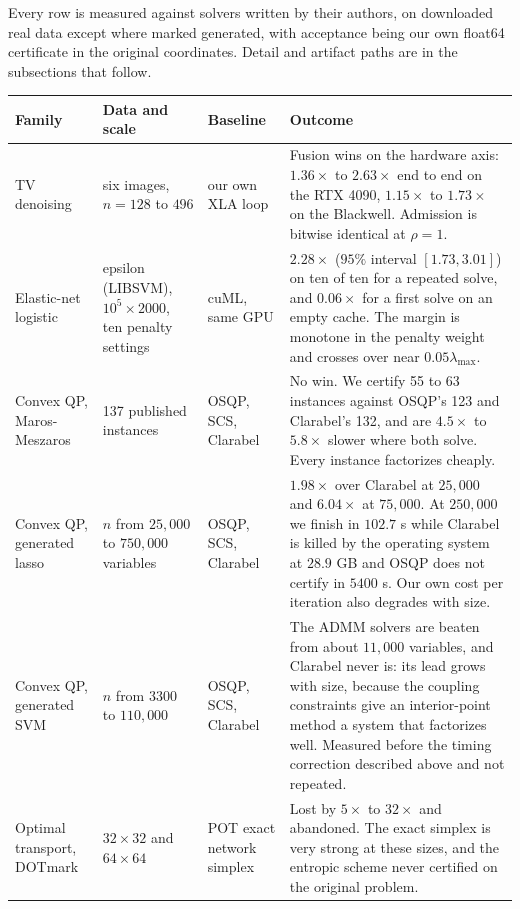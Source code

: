\documentclass[11pt]{article}
\begin{document}
Every row is measured against solvers written by their authors, on downloaded
real data except where marked generated, with acceptance being our own
float64 certificate in the original coordinates. Detail and artifact paths are
in the subsections that follow.

\begin{center}
\small
\begin{tabular}{p{2.5cm}p{2.6cm}p{2.2cm}p{6.1cm}}
\toprule
Family & Data and scale & Baseline & Outcome \\
\midrule
TV denoising & six images, $n=128$ to $496$ & our own XLA loop & Fusion wins on the hardware axis: $1.36\times$ to $2.63\times$ end to end on the RTX 4090, $1.15\times$ to $1.73\times$ on the Blackwell. Admission is bitwise identical at $\rho=1$. \\
\addlinespace
Elastic-net logistic & epsilon (LIBSVM), $10^5\times2000$, ten penalty settings & cuML, same GPU & $2.28\times$ ($95\%$ interval $[1.73, 3.01]$) on ten of ten for a repeated solve, and $0.06\times$ for a first solve on an empty cache. The margin is monotone in the penalty weight and crosses over near $0.05\lambda_{\max}$. \\
\addlinespace
Convex QP, Maros-Meszaros & 137 published instances & OSQP, SCS, Clarabel & No win. We certify 55 to 63 instances against OSQP's 123 and Clarabel's 132, and are $4.5\times$ to $5.8\times$ slower where both solve. Every instance factorizes cheaply. \\
\addlinespace
Convex QP, generated lasso & $n$ from $25{,}000$ to $750{,}000$ variables & OSQP, SCS, Clarabel & $1.98\times$ over Clarabel at $25{,}000$ and $6.04\times$ at $75{,}000$. At $250{,}000$ we finish in $102.7$ s while Clarabel is killed by the operating system at $28.9$ GB and OSQP does not certify in $5400$ s. Our own cost per iteration also degrades with size. \\
\addlinespace
Convex QP, generated SVM & $n$ from $3300$ to $110{,}000$ & OSQP, SCS, Clarabel & The ADMM solvers are beaten from about $11{,}000$ variables, and Clarabel never is: its lead grows with size, because the coupling constraints give an interior-point method a system that factorizes well. Measured before the timing correction described above and not repeated. \\
\addlinespace
Optimal transport, DOTmark & $32\times32$ and $64\times64$ & POT exact network simplex & Lost by $5\times$ to $32\times$ and abandoned. The exact simplex is very strong at these sizes, and the entropic scheme never certified on the original problem. \\
\bottomrule
\end{tabular}
\end{center}
\end{document}
